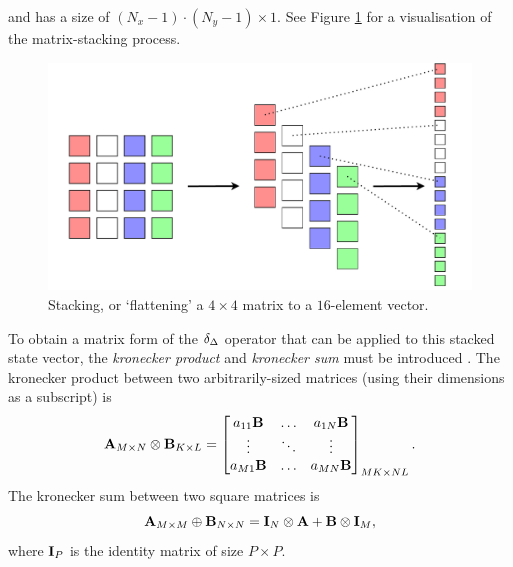 and has a size of $(N_x-1)\cdot (N_y-1) \times 1$. See Figure \ref{fig:stackingMatrix} for a visualisation of the matrix-stacking process.
\begin{figure}[t]
    \centering
    \includegraphics[width=\textwidth]{figures/resonators/2d/stackingMatrix.pdf}
    \caption{Stacking, or `flattening' a $4\times 4$ matrix to a $16$-element vector. \label{fig:stackingMatrix}}
\end{figure}

To obtain a matrix form of the $\delta_{\Delta}$ operator that can be applied to this stacked state vector, the \textit{kronecker product} and \textit{kronecker sum} must be introduced \cite{Horn1991}. The kronecker product between two arbitrarily-sized matrices (using their dimensions as a subscript) is
\begin{equation}
    \mathbf{A}_{M\times N} \otimes \mathbf{B}_{K\times L} = \begin{bmatrix}
        a_{11}\mathbf{B} & \hdots & a_{1N}\mathbf{B}\\
        \vdots & \ddots & \vdots\\
        a_{M1}\mathbf{B} & \hdots & a_{MN}\mathbf{B}\\
    \end{bmatrix}_{MK \times NL}.
\end{equation}
The kronecker sum between two square matrices is 
\begin{equation}
    \mathbf{A}_{M \times M} \oplus \mathbf{B}_{N \times N} = \mathbf{I}_N\otimes \mathbf{A} + \mathbf{B} \otimes\mathbf{I}_M,
\end{equation}
where $\mathbf{I}_P$ is the identity matrix of size $P\times P$. 

